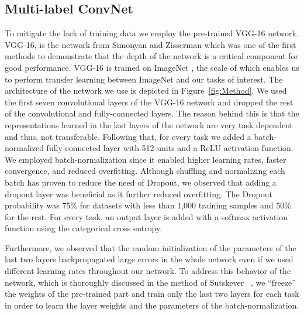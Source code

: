 \documentclass[10pt,twocolumn,letterpaper]{article}
\begin{document}
	\subsection{Multi-label ConvNet}
	To mitigate the lack of training data we employ the pre-trained VGG-16 \cite{simonyan2014very} network.  VGG-16, is the network from Simonyan and Zisserman which was one of the first methods to demonstrate that the depth of the network is a critical component for good performance. VGG-16 is trained on ImageNet \cite{russakovsky2015imagenet}, the scale of which enables us to perform transfer learning between ImageNet and our tasks of interest. The architecture of the network we use is depicted in Figure~\ref{fig:Method}. We used the first seven convolutional layers of the VGG-16 network and dropped the rest of the convolutional and fully-connected layers. The reason behind this is that the representations learned in the last layers of the network are very task dependent \cite{yosinski2014transferable} and thus, not transferable. Following that, for every task we added a batch-normalized \cite{ioffe2015batch} fully-connected layer with 512 units and a ReLU activation function. We employed batch-normalization since it enabled higher learning rates, faster convergence, and reduced overfitting. Although shuffling and normalizing each batch has proven to reduce the need of Dropout, we observed that adding a dropout layer \cite{srivastava2014dropout} was beneficial as it further reduced overfitting. The Dropout probability was 75\% for datasets with less than 1,000 training samples and 50\% for the rest. For every task, an output layer is added with a softmax activation function using the categorical cross entropy.
	
	Furthermore, we observed that the random initialization of the parameters of the last two layers backpropagated large errors in the whole network even if we used different learning rates throughout our network. To address this behavior of the network, which is thoroughly discussed in the method of Sutskever \etal~\cite{sutskever2013importance}, we ``freeze'' the weights of the pre-trained part and train only the last two layers for each task in order to learn the layer weights and the parameters of the batch-normalization. 
	
\end{document}

